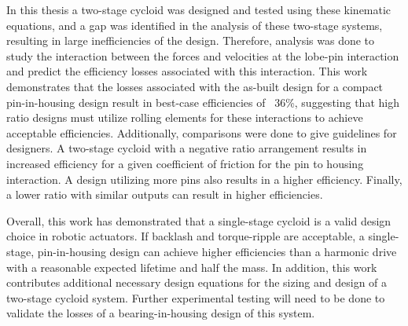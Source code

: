 In this thesis a two-stage cycloid was designed and tested using these kinematic equations, and a gap was identified in the analysis of these two-stage systems, resulting in large inefficiencies of the design. Therefore, analysis was done to study the interaction between the forces and velocities at the lobe-pin interaction and predict the efficiency losses associated with this interaction. This work demonstrates that the losses associated with the as-built design for a compact pin-in-housing design result in best-case efficiencies of ~36\%, suggesting that high ratio designs must utilize rolling elements for these interactions to achieve acceptable efficiencies. Additionally, comparisons were done to give guidelines for designers. A two-stage cycloid with a negative ratio arrangement results in increased efficiency for a given coefficient of friction for the pin to housing interaction. A design utilizing more pins also results in a higher efficiency. Finally, a lower ratio with similar outputs can result in higher efficiencies. 

Overall, this work has demonstrated that a single-stage cycloid is a valid design choice in robotic actuators. If backlash and torque-ripple are acceptable, a single-stage, pin-in-housing design can achieve higher efficiencies than a harmonic drive with a reasonable expected lifetime and half the mass. In addition, this work contributes additional necessary design equations for the sizing and design of a two-stage cycloid system. Further experimental testing will need to be done to validate the losses of a bearing-in-housing design of this system. 
